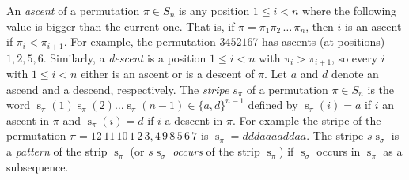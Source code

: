\documentclass[a4paper]{llncs}
\newcommand{\Perm}[1]{\mathcal{S}_{#1}}
\newcommand{\ptext}{\pi}
\newcommand{\pmotif}{\sigma}
\DeclareMathOperator{\stripea}{s}
\newcommand{\stripe}[2]{\stripea_{{#1}}({#2})}
\newcommand{\stripew}[1]{\stripea_{{#1}}}
\newcommand{\dstep}{d}
\newcommand{\ustep}{a}
\begin{document}
An \emph{ascent} of a permutation $\pi \in S_n$ is any position 
$1 \leq i < n$ where the following value is bigger than the current one. 
That is, if $\pi = \pi_1\pi_2\,\ldots\,\pi_n$, then
$i$ is an ascent if $\pi_i < \pi_{i+1}$.
For example, the permutation 
$345216$7 has ascents (at positions) $1,2,5,6$.
Similarly, a \emph{descent} is a position 
$1 \leq i < n$ with $\pi_i > \pi_{i+1}$, 
so every $i$ with $1 \leq i < n$ either is an ascent or is a descent of 
$\pi$.
Let $\ustep$ and $\dstep$ denote an ascend and a descend, respectively.
The \emph{stripe} $s_\pi$ of a permutation $\pi \in S_n$ is the word
$\stripe{\pi}{1} \stripe{\pi}{2} \ldots \stripe{\pi}{n-1} \in \{\ustep,\dstep\}^{n-1}$ 
defined by 
$ \stripe{\pi}{i}= \ustep$ if $i$ an ascent in $\pi$ and
$\stripe{\pi}{i} = \dstep$ if $i$ a descent in $\pi$.
For example the stripe of the permutation 
$\pi = 12\,11\,10\,1\,2\,3,4\,9\,8\,5\,6\,7$ 
is 
$\stripew{\pi} = \dstep\dstep\dstep\ustep\ustep\ustep\ustep\dstep\dstep\ustep\ustep$.
The stripe $s\stripew{\sigma}$ is a \emph{pattern} of the strip $\stripew{\pi}$
(or $s\stripew{\sigma}$ \emph{occurs} of the strip $\stripew{\pi}$) if $\stripew{\sigma}$ occurs in
$\stripew{\pi}$ as a subsequence.


		
\end{document}
